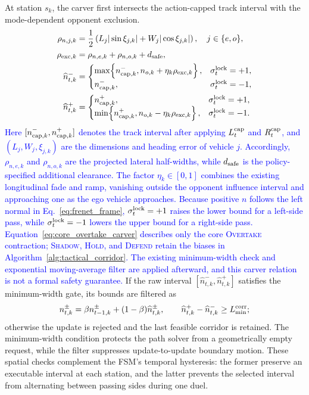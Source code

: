 At station $s_k$, the carver first intersects the action-capped track interval
with the mode-dependent opponent exclusion.
{\color{blue}
\begin{equation}
\begin{aligned}
\rho_{n,j,k}
&=\frac{1}{2}\left(
L_j|\sin\xi_{j,k}|+W_j|\cos\xi_{j,k}|
\right),\quad j\in\{e,o\},\\
\rho_{{\rm exc},k}
&=\rho_{n,e,k}+\rho_{n,o,k}+d_{\rm safe},\\
\widehat n_{t,k}^{-}
&=\begin{cases}
\max\!\left\{n_{{\rm cap},k}^{-},
n_{o,k}+\eta_k\rho_{{\rm exc},k}\right\},
&\sigma_t^{\rm lock}=+1,\\
n_{{\rm cap},k}^{-},&\sigma_t^{\rm lock}=-1,
\end{cases}\\
\widehat n_{t,k}^{+}
&=\begin{cases}
n_{{\rm cap},k}^{+},&\sigma_t^{\rm lock}=+1,\\
\min\!\left\{n_{{\rm cap},k}^{+},
n_{o,k}-\eta_k\rho_{{\rm exc},k}\right\},
&\sigma_t^{\rm lock}=-1.
\end{cases}
\end{aligned}
\label{eq:core_overtake_carver}
\end{equation}
}
\textcolor{blue}{Here
$[n_{{\rm cap},k}^{-},n_{{\rm cap},k}^{+}]$ denotes the track interval after
applying $L_t^{\rm cap}$ and $R_t^{\rm cap}$, and
$(L_j,W_j,\xi_{j,k})$ are the dimensions and heading error of vehicle $j$.
Accordingly, $\rho_{n,e,k}$ and $\rho_{n,o,k}$ are the projected lateral
half-widths, while $d_{\rm safe}$ is the policy-specified additional clearance.
The factor $\eta_k\in[0,1]$ combines the existing longitudinal fade and ramp,
vanishing outside the opponent influence interval and approaching one as the
ego vehicle approaches.  Because positive $n$ follows the left normal in
Eq.~\eqref{eq:frenet_frame}, $\sigma_t^{\rm lock}=+1$ raises the lower bound
for a left-side pass, while $\sigma_t^{\rm lock}=-1$ lowers the upper bound for
a right-side pass.  Equation~\eqref{eq:core_overtake_carver} describes only the
core \textsc{Overtake} contraction; \textsc{Shadow}, \textsc{Hold}, and
\textsc{Defend} retain the biases in Algorithm~\ref{alg:tactical_corridor}.
The existing minimum-width check and exponential moving-average filter are
applied afterward, and this carver relation is not a formal safety guarantee.}
If the raw interval
$[\widehat n_{t,k}^-,\widehat n_{t,k}^+]$ satisfies the minimum-width gate, its
bounds are filtered as
\begin{equation}
n_{t,k}^{\pm}=\beta n_{t-1,k}^{\pm}
 +(1-\beta)\widehat n_{t,k}^{\pm},\qquad
\widehat n_{t,k}^+-\widehat n_{t,k}^-\ge L_{\min}^{\rm corr};
\label{eq:corridor_filter}
\end{equation}
otherwise the update is rejected and the last feasible corridor is retained.
The minimum-width condition protects the path solver from a geometrically
empty request, while the filter suppresses update-to-update boundary motion.
These spatial checks complement the FSM's temporal hysteresis: the former
preserve an executable interval at each station, and the latter prevents the
selected interval from alternating between passing sides during one duel.


